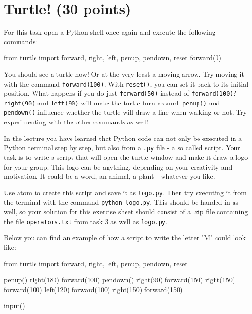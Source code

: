 \section{Turtle! (30 points)}

For this task open a Python shell once again and execute the following commands:

\begin{pythoncode}

from turtle import forward, right, left, penup, pendown, reset
forward(0)

\end{pythoncode}

\noindent You should see a turtle now! Or at the very least a moving arrow. Try moving it with the command \texttt{forward(100)}.
With \texttt{reset()}, you can set it back to its initial position. What happens if you do just \texttt{forward(50)} instead of \texttt{forward(100)}?
\texttt{right(90)} and \texttt{left(90)} will make the turtle turn around. \texttt{penup()} and \texttt{pendown()} influence whether the turtle will draw a line when walking or not. Try experimenting with the other commands as well!

\vspace{1em}

\noindent In the lecture you have learned that Python code can not only be executed in a Python terminal step by step, but also from a \texttt{.py} file - a so called script. Your task is to write a script that will open the turtle window and make it draw a logo for your group. This logo can be anything, depending on your creativity and motivation. It could be a word, an animal, a plant - whatever you like.

\vspace{1em}

\noindent Use atom to create this script and save it as \texttt{logo.py}. Then try executing it from the terminal with the command \texttt{python logo.py}. This should be handed in as well, so your solution for this exercise sheet should consist of a .zip file containing the file \texttt{operators.txt} from task 3 as well as \texttt{logo.py}.

\noindent Below you can find an example of how a script to write the letter "M" could look like:

\begin{pythoncode}

from turtle import forward, right, left, penup, pendown, reset

penup()
right(180)
forward(100)
pendown()
right(90)
forward(150)
right(150)
forward(100)
left(120)
forward(100)
right(150)
forward(150)

input()

\end{pythoncode}

